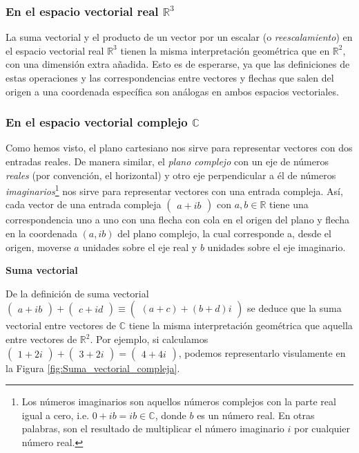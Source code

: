 \documentclass[12pt,dvipsnames]{article}
\begin{document}
\subsubsection{En el espacio vectorial real \texorpdfstring{$\mathbb{R}^3$}{TEXT}}

La suma vectorial y el producto de un vector por un escalar (o \emph{reescalamiento}) en el espacio vectorial real $\mathbb{R}^3$ tienen la misma interpretación geométrica que en $\mathbb{R}^2$, con una dimensión extra añadida. Esto es de esperarse, ya que las definiciones de estas operaciones y las correspondencias entre vectores y flechas que salen del origen a una coordenada específica son análogas en ambos espacios vectoriales.

\subsubsection{En el espacio vectorial complejo \texorpdfstring{$\mathbb{C}$}{TEXT}}

Como hemos visto, el plano cartesiano nos sirve para representar vectores con dos entradas reales. De manera similar, el \emph{plano complejo} \textemdash con un eje de números \emph{reales} (por convención, el horizontal) y otro eje perpendicular a él de números \emph{imaginarios}\footnote{Los números imaginarios son aquellos números complejos con la parte real igual a cero, i.e. $0+ib=ib\in\mathbb{C}$, donde $b$ es un número real. En otras palabras, son el resultado de multiplicar el número imaginario $i$ por cualquier número real.}\textemdash\hspace{0.5mm} nos sirve para representar vectores con una entrada compleja. Así, cada vector de una entrada compleja $\begin{pmatrix}a+ib\end{pmatrix}$ con $a,b\in\mathbb{R}$ tiene una correspondencia uno a uno con una flecha con cola en el origen del plano y flecha en la coordenada $(a,ib)$ del plano complejo, la cual corresponde a, desde el origen, moverse $a$ unidades sobre el eje real y $b$ unidades sobre el eje imaginario.

\vspace{3mm}
\textbf{Suma vectorial}
\vspace{3mm}

De la definición de suma vectorial $\begin{pmatrix}a+ib\end{pmatrix}+\begin{pmatrix}c+id\end{pmatrix}\equiv\begin{pmatrix}(a+c)+(b+d)i\end{pmatrix}$ se deduce que la suma vectorial entre vectores de $\mathbb{C}$ tiene la misma interpretación geométrica que aquella entre vectores de $\mathbb{R}^2$. Por ejemplo, si calculamos $\begin{pmatrix}1+2i\end{pmatrix}+\begin{pmatrix}3+2i\end{pmatrix}=\begin{pmatrix}4+4i\end{pmatrix}$, podemos representarlo visulamente en la Figura \ref{fig:Suma_vectorial_compleja}.
\end{document}
